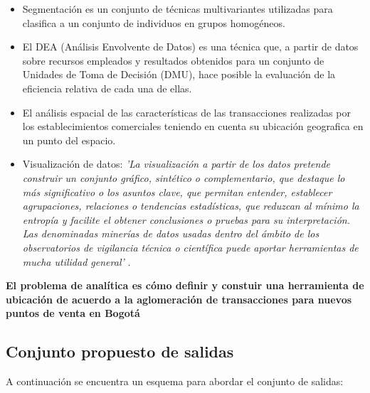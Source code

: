 \documentclass[a4paper]{article}
\begin{document}
\begin{itemize}
	\item Segmentación es un conjunto de técnicas multivariantes utilizadas para clasifica a un conjunto de individuos en grupos homogéneos. \cite{WEBSITE:1} %
	\item El DEA (Análisis Envolvente de Datos) es una técnica que, a partir de datos sobre recursos empleados y resultados obtenidos para un conjunto de Unidades de Toma de Decisión (DMU), hace posible la evaluación de la eficiencia relativa de cada una de ellas. \cite{ARTICLE:3} %
	\item El análisis espacial de las características de las transacciones realizadas por los establecimientos comerciales teniendo en cuenta su ubicación geografica en un punto del espacio.
	\item Visualización de datos: \textit{'La visualización a partir de los datos pretende construir un conjunto gráfico, sintético o complementario, que destaque lo más significativo o los asuntos clave, que permitan entender, establecer agrupaciones, relaciones o tendencias estadísticas, que reduzcan al mínimo la entropía y facilite el obtener conclusiones o pruebas para su interpretación. Las denominadas minerías de datos usadas dentro del ámbito de los observatorios de vigilancia técnica o científica puede aportar herramientas de mucha utilidad general'} \cite{ARTICLE:2}.
\end{itemize}

\textbf{El problema de analítica es cómo definir y constuir una herramienta de ubicación de acuerdo a la aglomeración de transacciones para nuevos puntos de venta en Bogotá}



\subsection{Conjunto propuesto de salidas}

A continuación se encuentra un esquema para abordar el conjunto de salidas:%
\end{document}
